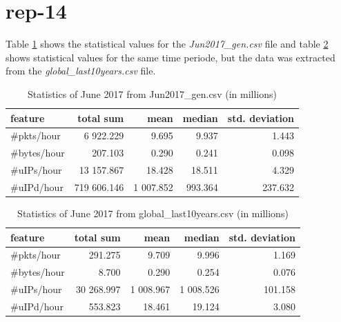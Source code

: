 \section*{rep-14}
Table \ref{tab:stat_jun2017_gen} shows the statistical values for the \textit{Jun2017\_gen.csv} file and table \ref{tab:stat_jun2017_global} shows statistical values for the same time periode, but the data was extracted from the \textit{global\_last10years.csv} file. 
\begin{table}[H]
\center
\begin{tabular}{lrrrr}
\toprule
feature & total sum & mean & median & std. deviation \\
\midrule
\#pkts/hour & 6 922.229  &   9.695  &    9.937  &   1.443 \\
\#bytes/hour & 207.103  &   0.290   &   0.241  &   0.098 \\
\#uIPs/hour  & 13 157.867  &  18.428  &   18.511 &    4.329 \\
\#uIPd/hour  & 719 606.146 &  1 007.852 &   993.364 &  237.632 \\
\bottomrule
\end{tabular}
\caption{Statistics of June 2017 from Jun2017\_gen.csv (in millions)}
\label{tab:stat_jun2017_gen}
\end{table}

\begin{table}[H]
\center
\begin{tabular}{lrrrr}
\toprule
feature & total sum & mean & median & std. deviation \\
\midrule
\#pkts/hour  &    291.275  &      9.709  &      9.996   &    1.169 \\
\#bytes/hour &      8.700  &      0.290  &      0.254   &    0.076 \\
\#uIPs/hour  & 30 268.997  &  1 008.967  &  1 008.526   &  101.158\\
\#uIPd/hour  &    553.823  &     18.461  &     19.124   &    3.080 \\
\bottomrule
\end{tabular}
\caption{Statistics of June 2017 from global\_last10years.csv (in millions)}
\label{tab:stat_jun2017_global}
\end{table}

